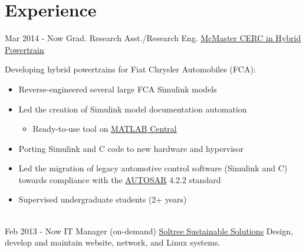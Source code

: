 \documentclass[letterpaper]{twentysecondcv} %
\begin{document}
\makeprofile %






\section{Experience}
\vspace{-.5em}
\begin{twenty} %
  \twentyitem
  {Mar 2014 -}
  {Now}
  {Grad. Research Asst./Research Eng.}
  {%
    \href{http://hybrid.mcmaster.ca/}{McMaster CERC in Hybrid Powertrain}}
  {}
  {Developing hybrid powertrains for Fiat Chrysler Automobiles (FCA):
    \begin{itemize}
      \item Reverse-engineered several large FCA Simulink models
      \item Led the creation of Simulink model documentation automation
      \begin{itemize}
        \item Ready-to-use tool on \href{https://www.mathworks.com/matlabcentral/fileexchange/63252-simulink-design-documenter}{\textsc{MATLAB} Central}
      \end{itemize}
      \item Porting Simulink and C code to new hardware and hypervisor
      \item Led the migration of legacy automotive control software (Simulink and C) towards compliance with the \href{https://www.autosar.org/standards/classic-platform/}{AUTOSAR} 4.2.2 standard
      \item Supervised undergraduate students (2+ years)
    \end{itemize}}
  \\
  \twentyitem
  {Feb 2013 -}
  {Now}
  {IT Manager (on-demand)}
  {\href{http://www.soltree.net/}{Soltree Sustainable Solutions}}
  {}
  {Design, develop and maintain website, network, and Linux systems.}
	\\

\end{twenty}
\end{document}
